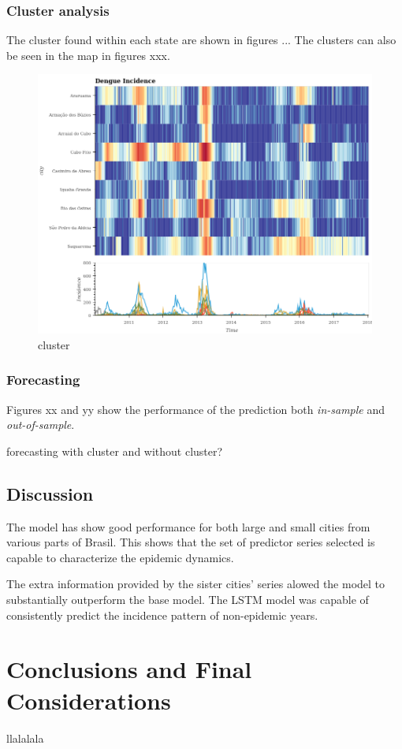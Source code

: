 \documentclass[12pt]{report}
\begin{document}
\subsection{Cluster analysis}
The cluster found within each state are shown in figures ... The clusters can 
also be seen in the map in figures xxx.
\begin{figure}[h]
 \centering
 \includegraphics[scale=0.4]{./cluster_3300209.png}
 \caption{cluster}
\end{figure}

\subsection{Forecasting}

Figures xx and yy show the performance of the prediction  both \emph{in-sample} 
and  \emph{out-of-sample}.

forecasting with cluster and without cluster?

\section{Discussion}

The model has show good performance for both large and small cities from various parts of Brasil. This shows that the set of predictor series selected is capable to characterize the epidemic dynamics.

The extra information provided by the sister cities' series alowed the model to substantially outperform the base model. The LSTM model was capable of consistently predict the incidence pattern of non-epidemic years. 

\newpage
\chapter{Conclusions and Final Considerations}

\newpage
{}
{}



\newpage
{}
{}
llalalala
\end{document}
